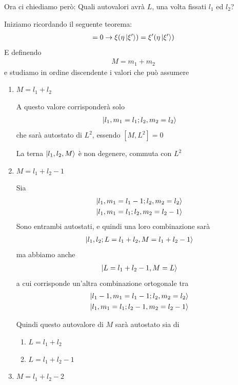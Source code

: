 Ora ci chiediamo però: Quali autovalori avrà $L$, una volta fissati $l_1$ ed $l_2$? 

Iniziamo ricordando il seguente teorema:
\begin{align}
[\xi, \eta]=0 \rightarrow \xi(\eta\ket{\xi'})=\xi'(\eta\ket{\xi'})
\end{align}
E definendo
\begin{align}
M= m_1 + m_2
\end{align}
e studiamo in ordine discendente i valori che può assumere

\begin{enumerate}
	\item $M= l_1 + l_2$
	
	A questo valore corrisponderà solo 
	\begin{align}
	\ket{l_1,m_1=l_1; l_2,m_2=l_2}
	\end{align}
	che sarà autostato di $L^2$, essendo $[M,L^2]=0$
	
	La terna $\ket{l_1,l_2,M}$ è non degenere, commuta con $L^2$
	
	\item $M=l_1 + l_2-1$
	
	Sia 
	\begin{align}
	\ket{l_1,m_1= l_1 -1; l_2,m_2= l_2} \\
	\ket{l_1,m_1=l_1; l_2,m_2=l_2-1}
	\end{align}
	Sono entrambi autostati, e quindi una loro combinazione sarà
	\begin{align}
	\ket{l_1,l_2;L=l_1+l_2,M=l_1+l_2-1}
	\end{align}
	ma abbiamo anche
	\begin{align}
	\ket{L= l_1 + l_2 -1, M=L}
	\end{align}
	a cui corrisponde un'altra combinazione ortogonale tra
	\begin{align}
	\ket{l_1-1,m_1= l_1 -1; l_2,m_2= l_2} \\
	\ket{l_1,m_1=l_1; l_2-1,m_2=l_2-1}
	\end{align}

	\newpage

	Quindi questo autovalore di $M$ sarà autostato sia di 
	\begin{enumerate}
		\item $L=l_1 + l_2$ 
		\item $L=l_1 + l_2-1$
		
	\end{enumerate}
	\item $M=l_1 + l_2 - 2$
	

\end{enumerate}
